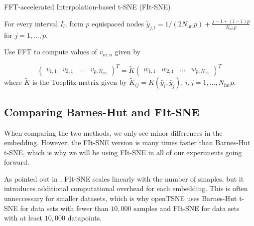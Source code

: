 \begin{algorithm}[H]
    \caption{FFT-accelerated Interpolation-based t-SNE (FIt-SNE)}
    \label{alg:fit-sne}


    For every interval $I_l$, form $p$ equispaced nodes $\tilde{y}_{j, l} = 1/(2N_{\text{int}}p) + \frac{j-1 + (l-1)p}{N_{\text{int}}p}$ for $j=1,\dots,p$. 


    Use FFT to compute values of $v_{m,n}$ given by 

        \[
            \begin{pmatrix}
                v_{1,1} & v_{2,1} & \dots & v_{p, N_{\text{int}}}
            \end{pmatrix}^T = \tilde{K} \begin{pmatrix}
                w_{1,1} & w_{2,1} & \dots & w_{p, N_{\text{int}}}
            \end{pmatrix}^T
        \]
    where $\tilde{K}$ is the Toeplitz matrix given by $\tilde{K}_{ij} = K(\tilde{y_i}, \tilde{y_j})$, $i, j = 1, \dots, N_{\text{int}}p$.
    

\end{algorithm}

\subsection{Comparing Barnes-Hut and FIt-SNE}
When comparing the two methods, we only see minor differences in the embedding. 
However, the FIt-SNE version is many times faster than Barnes-Hut t-SNE, which is why we will be using FIt-SNE in all of our experiments going forward. 

As pointed out in \cite{openTSNE}, FIt-SNE scales linearly with the number of smaples, but it introduces additional computational overhead for each embedding.
This is often unneccessary for smaller datasets, which is why openTSNE uses Barnes-Hut t-SNE for data sets with fewer than $10,000$ samples and FIt-SNE for data sets with at least $10,000$ datapoints. 

